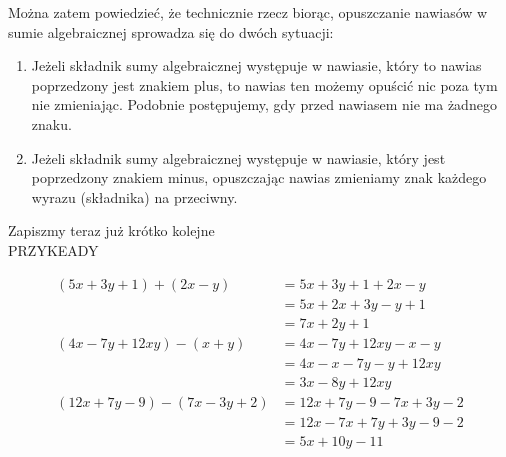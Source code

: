 \documentclass[10pt]{article}
\begin{document}
Można zatem powiedzieć, że technicznie rzecz biorąc, opuszczanie nawiasów w sumie algebraicznej sprowadza się do dwóch sytuacji:

\begin{enumerate}
  \item Jeżeli składnik sumy algebraicznej występuje w nawiasie, który to nawias poprzedzony jest znakiem plus, to nawias ten możemy opuścić nic poza tym nie zmieniając. Podobnie postępujemy, gdy przed nawiasem nie ma żadnego znaku.
  \item Jeżeli składnik sumy algebraicznej występuje w nawiasie, który jest poprzedzony znakiem minus, opuszczając nawias zmieniamy znak każdego wyrazu (składnika) na przeciwny.
\end{enumerate}

Zapiszmy teraz już krótko kolejne\\
PRZYKEADY

\[
\begin{aligned}
(5 x+3 y+1)+(2 x-y) & =5 x+3 y+1+2 x-y \\
& =5 x+2 x+3 y-y+1 \\
& =7 x+2 y+1 \\
(4 x-7 y+12 x y)-(x+y) & =4 x-7 y+12 x y-x-y \\
& =4 x-x-7 y-y+12 x y \\
& =3 x-8 y+12 x y \\
(12 x+7 y-9)-(7 x-3 y+2) & =12 x+7 y-9-7 x+3 y-2 \\
& =12 x-7 x+7 y+3 y-9-2 \\
& =5 x+10 y-11
\end{aligned}
\]
\end{document}
